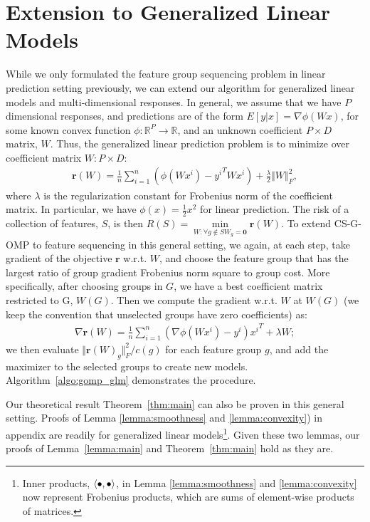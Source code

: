 \section{Extension to Generalized Linear Models}
\label{sec:extension}
While we only formulated the feature group sequencing problem in linear prediction setting previously, we can extend our algorithm for generalized linear models\cite{glm} and multi-dimensional responses. In general, we assume that we have $P$ dimensional responses, and predictions are of the form $E[y | x ] = \nabla \phi( W x)$, for some known convex function $\phi : \mathbb{R}^P \rightarrow \mathbb{R}$, and an unknown coefficient $P\times D$ matrix, $W$. Thus, the generalized linear
prediction problem is to minimize over coefficient matrix $W: P\times D$:
\begin{align}
	\textbf{r}(W) = \frac{1}{n} \sum _{i=1}^n (\phi(Wx^i) - {y^i}^TWx^i) 
		+ \frac{\lambda}{2} \Vert W\Vert^2_F,
		\label{eq:glm_loss}
\end{align}
where $\lambda$ is the regularization constant for Frobenius norm of the coefficient 
matrix. In particular, we have $\phi(x) = \frac{1}{2}x^2$ for linear prediction. 
The risk of a collection of features, $S$, is then 
\mbox{$R(S) = \underset{W : \forall g \notin S  W_g = \textbf{0} }{\min} \textbf{r}(W)$}. 
To extend CS-G-OMP to feature sequencing in this general setting, we again, at each step,
take gradient of the objective $\textbf{r}$ w.r.t. $W$, and choose the feature group that has the largest ratio of group gradient Frobenius norm square to group cost. More specifically, after choosing groups in $G$, we have a best coefficient matrix restricted to G, $W(G)$. Then we compute the gradient w.r.t. $W$ at $W(G)$ (we keep the convention that unselected groups have zero coefficients) as:
\begin{align}
	\nabla \textbf{r}(W) = \frac{1}{n} \sum _{i=1}^n (\nabla \phi(Wx^i) - y^i){x^i}^T + \lambda W;
	\label{eq:glm_gradient}
\end{align}
we then evaluate $\Vert \textbf{r}(W)_g \Vert_F^2 / c(g)$ for each feature group $g$, and add the maximizer to the selected groups to create new models. 
Algorithm~\ref{algo:gomp_glm} demonstrates the procedure. 

Our theoretical result Theorem~\ref{thm:main} can also be proven in this general setting. 
Proofs of Lemma \ref{lemma:smoothness} and \ref{lemma:convexity}) in appendix are readily for generalized linear models\footnote{Inner products, $\langle \bullet, \bullet \rangle$, in Lemma \ref{lemma:smoothness} and \ref{lemma:convexity} now represent Frobenius products, which are sums of element-wise products of matrices.}. Given these two lemmas, our proofs of Lemma~\ref{lemma:main}
and Theorem~\ref{thm:main} hold as they are. 


